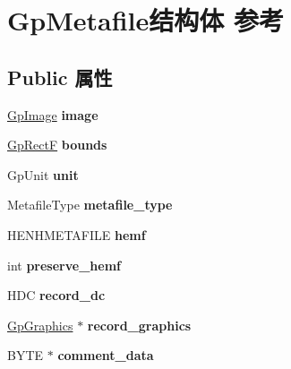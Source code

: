 \hypertarget{struct_gp_metafile}{}\section{Gp\+Metafile结构体 参考}
\label{struct_gp_metafile}
\subsection*{Public 属性}
\begin{DoxyCompactItemize}
\item 
\mbox{\label{struct_gp_metafile_a57e060e2dbb26df05218a1ce8a98707f}} 
\hyperlink{struct_gp_image}{Gp\+Image} {\bfseries image}
\item 
\mbox{\label{struct_gp_metafile_abfd22292a7ae31ab461d884cdc79015f}} 
\hyperlink{struct_rect_f}{Gp\+RectF} {\bfseries bounds}
\item 
\mbox{\label{struct_gp_metafile_aaebc82540e3fa6881afd31a65295a875}} 
Gp\+Unit {\bfseries unit}
\item 
\mbox{\label{struct_gp_metafile_adb0a772562a743ce84ea802cdea9e2fe}} 
Metafile\+Type {\bfseries metafile\+\_\+type}
\item 
\mbox{\label{struct_gp_metafile_af89089fcaef7abe0260a30db73ecdea4}} 
H\+E\+N\+H\+M\+E\+T\+A\+F\+I\+LE {\bfseries hemf}
\item 
\mbox{\label{struct_gp_metafile_ae002bd1f75b4e10eedaec0ad6aefcb55}} 
int {\bfseries preserve\+\_\+hemf}
\item 
\mbox{\label{struct_gp_metafile_a28f33d521acf1539bb0f03abdc7c317a}} 
H\+DC {\bfseries record\+\_\+dc}
\item 
\mbox{\label{struct_gp_metafile_a71a4e8cd26a8d401c7f177573aed8c7a}} 
\hyperlink{struct_gp_graphics}{Gp\+Graphics} $\ast$ {\bfseries record\+\_\+graphics}
\item 
\mbox{\label{struct_gp_metafile_a4b459848474c369ec4897f34f2bf1745}} 
B\+Y\+TE $\ast$ {\bfseries comment\+\_\+data}

\end{DoxyCompactItemize}
